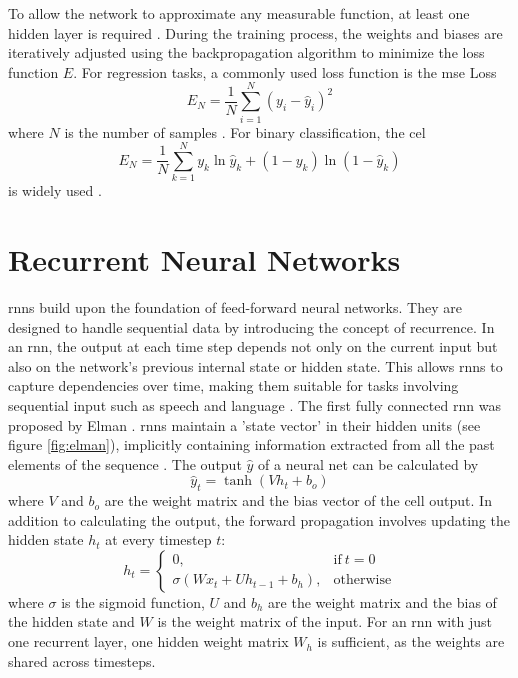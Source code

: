 \documentclass[12pt, a4paper, headinclude, twoside, plainheadsepline, open=right, numbers=noenddot, hidelinks, toc=listof, toc=bibliography]{scrreprt}
\begin{document}
To allow the network to approximate any measurable function, at least one hidden layer is required \cite{hornikMultilayerFeedforwardNetworks1989}.
During the training process, the weights and biases are iteratively adjusted using the backpropagation algorithm to minimize the loss function $E$.
For regression tasks, a commonly used loss function is the \ac{mse} Loss
\begin{equation}
E_N = \frac{1}{N} \sum_{i=1}^{N}(y_{i} - \hat{y}_{i})^2
\end{equation}
where $N$ is the number of samples \cite{lianoRobustErrorMeasure1996a}.
 For binary classification, the \ac{cel}
\begin{equation}
E_N = \frac{1}{N} \sum_{k=1}^{N} y_k \ln{\hat{y}_k} + (1-y_k) \ln{(1-\hat{y}_k)}
\end{equation}
is widely used \cite{zhangGeneralizedCrossEntropy2018}.





\section{Recurrent Neural Networks}
\label{sec:rnn}
\Acp{rnn} build upon the foundation of feed-forward neural networks. They are designed to handle sequential data by introducing the concept of recurrence. In an \ac{rnn}, the output at each time step depends not only on the current input but also on the network's previous internal state or hidden state. This allows \acp{rnn} to capture dependencies over time, making them suitable for tasks involving sequential input such as speech and language \cite{lecunDeepLearning2015}.
The first fully connected \ac{rnn} was proposed by Elman \cite{elmanFindingStructureTime1990}.
\Acp{rnn} maintain a 'state vector' in their hidden units (see figure \ref{fig:elman}), implicitly containing information extracted from all the past elements of the sequence \cite{lecunDeepLearning2015}.
The output $\hat{y}$ of a neural net can be calculated by
\begin{equation}
\label{eq:rnn_output}
\hat{y}_t = \tanh(V h_t + b_o)
\end{equation}
where $V$ and $b_o$ are the weight matrix and the bias vector of the cell output.
In addition to calculating the output, the forward propagation involves updating the hidden state $h_t$ at every timestep $t$:
\begin{equation}
\label{eq:rnn_update}
h_t =
\begin{cases}
	0, & \text{if}\ t = 0 \\
	\sigma (W x_t + U h_{t-1} +  b_h), & \text{otherwise}
\end{cases}
\end{equation}
where $\sigma$ is the sigmoid function, $U$ and $b_h$ are the weight matrix and the bias of the hidden state and $W$ is the weight matrix of the input.
For an \ac{rnn} with just one recurrent layer, one hidden weight matrix $W_h$ is sufficient, as the weights are shared across timesteps.
\end{document}
